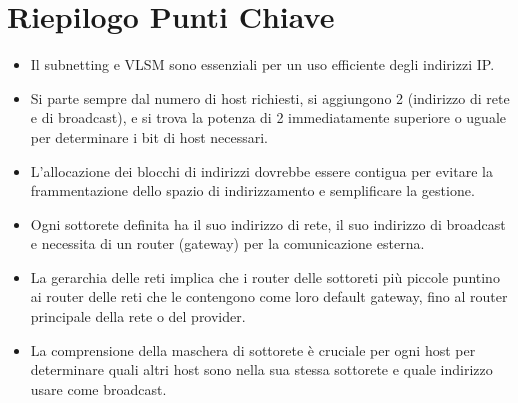 \newpage
\section{Riepilogo Punti Chiave}
\begin{itemize}
    \item Il subnetting e VLSM sono essenziali per un uso efficiente degli indirizzi IP.
    \item Si parte sempre dal numero di host richiesti, si aggiungono 2 (indirizzo di rete e di broadcast), e si trova la potenza di 2 immediatamente superiore o uguale per determinare i bit di host necessari.
    \item L'allocazione dei blocchi di indirizzi dovrebbe essere contigua per evitare la frammentazione dello spazio di indirizzamento e semplificare la gestione.
    \item Ogni sottorete definita ha il suo indirizzo di rete, il suo indirizzo di broadcast e necessita di un router (gateway) per la comunicazione esterna.
    \item La gerarchia delle reti implica che i router delle sottoreti più piccole puntino ai router delle reti che le contengono come loro default gateway, fino al router principale della rete o del provider.
    \item La comprensione della maschera di sottorete è cruciale per ogni host per determinare quali altri host sono nella sua stessa sottorete e quale indirizzo usare come broadcast.
\end{itemize}

